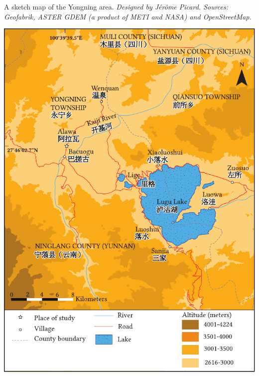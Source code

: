 \begin{mapfigure}[p!]
	\caption{A sketch map of the Yongning area. \textit{Designed by Jérôme Picard. Sources: Geofabrik, ASTER GDEM (a product of METI and NASA) and OpenStreetMap.}}
\includegraphics{figures/map/PDF_CMYK_1point4.pdf} %


	\label{map:1-1}
\end{mapfigure}


